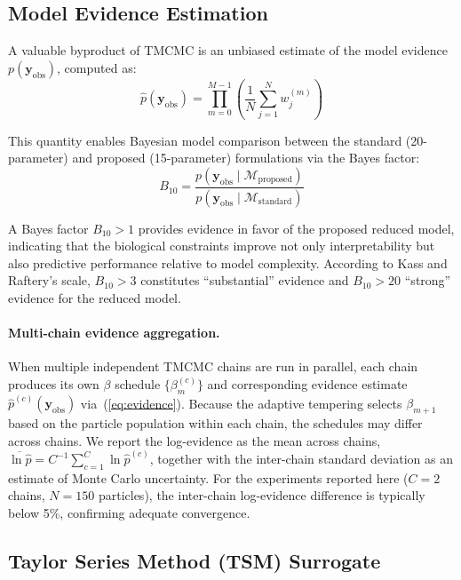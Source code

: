 \documentclass[11pt,a4paper]{article}
\begin{document}
\subsection{Model Evidence Estimation}

A valuable byproduct of TMCMC is an unbiased estimate of the model evidence $p(\mathbf{y}_{\mathrm{obs}})$, computed as:
\begin{equation}
\hat{p}(\mathbf{y}_{\mathrm{obs}}) = \prod_{m=0}^{M-1} \left(\frac{1}{N} \sum_{j=1}^{N} w_j^{(m)}\right)
\label{eq:evidence}
\end{equation}

\noindent This quantity enables Bayesian model comparison between the standard (20-parameter) and proposed (15-parameter) formulations via the Bayes factor:
\begin{equation}
B_{10} = \frac{p(\mathbf{y}_{\mathrm{obs}} \mid \mathcal{M}_{\mathrm{proposed}})}{p(\mathbf{y}_{\mathrm{obs}} \mid \mathcal{M}_{\mathrm{standard}})}
\end{equation}

\noindent A Bayes factor $B_{10} > 1$ provides evidence in favor of the proposed reduced model, indicating that the biological constraints improve not only interpretability but also predictive performance relative to model complexity. According to Kass and Raftery's scale, $B_{10} > 3$ constitutes ``substantial'' evidence and $B_{10} > 20$ ``strong'' evidence for the reduced model.

\paragraph{Multi-chain evidence aggregation.}
When multiple independent TMCMC chains are run in parallel, each chain produces its own $\beta$ schedule $\{\beta_m^{(c)}\}$ and corresponding evidence estimate $\hat{p}^{(c)}(\mathbf{y}_\mathrm{obs})$ via~(\ref{eq:evidence}).
Because the adaptive tempering selects $\beta_{m+1}$ based on the particle population within each chain, the schedules may differ across chains.
We report the log-evidence as the mean across chains, $\overline{\ln \hat{p}} = C^{-1}\sum_{c=1}^{C}\ln\hat{p}^{(c)}$, together with the inter-chain standard deviation as an estimate of Monte Carlo uncertainty.
For the experiments reported here ($C=2$ chains, $N=150$ particles), the inter-chain log-evidence difference is typically below 5\%, confirming adequate convergence.

\subsection{Taylor Series Method (TSM) Surrogate}
\label{sec:tsm}
\end{document}
